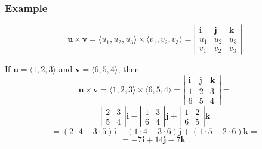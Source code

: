 \begin{frame}
 \frametitle{Example}

$$\textbf{u} \times \textbf{v} = \langle u_1, u_2, u_3 \rangle \times \langle v_1, v_2, v_3 \rangle =
\left|  \begin{array}{ccc}
      \textbf{i} & \textbf{j} & \textbf{k} \\
      u_1 & u_2 & u_3 \\
      v_1 & v_2 & v_3
        \end{array}
\right|$$

If $\textbf{u} = \langle 1,2,3\rangle$ and $\textbf{v} = \langle 6,5,4 \rangle$, then
%
$$\textbf{u} \times \textbf{v} = \langle 1, 2, 3 \rangle \times \langle 6, 5, 4 \rangle =
\left|  \begin{array}{ccc}
      \textbf{i} & \textbf{j} & \textbf{k} \\
      1 & 2 & 3 \\
      6 & 5 & 4
        \end{array}
\right| = $$
%
$$= \left| \begin{array}{cc}
           2 & 3\\
	   5 & 4
          \end{array}
\right| \textbf{i} - \left| \begin{array}{cc}
           1 & 3\\
	   6 & 4
          \end{array}
\right| \textbf{j} + \left| \begin{array}{cc}
           1 & 2\\
	   6 & 5
          \end{array}
\right| \textbf{k}  = $$
%
$$=(2\cdot 4 -3\cdot 5) \textbf{i} - (1\cdot 4 - 3\cdot 6) \textbf{j} + (1 \cdot 5 - 2\cdot 6) \textbf{k} =$$
%
$$= -7 \textbf{i} + 14 \textbf{j} -7 \textbf{k} \; .$$
%
\end{frame}